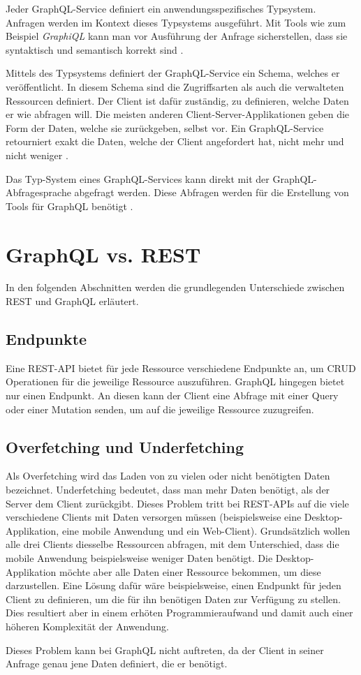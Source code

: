 Jeder GraphQL-Service definiert ein anwendungsspezifisches Typsystem.
Anfragen werden im Kontext dieses Typsystems ausgeführt.
Mit Tools wie zum Beispiel \textit{GraphiQL} kann man vor Ausführung der Anfrage sicherstellen, dass sie syntaktisch und semantisch korrekt sind \parencite[Abs. 1]{graphqlOnline}.

Mittels des Typsystems definiert der GraphQL-Service ein Schema, welches er veröffentlicht.
In diesem Schema sind die Zugriffsarten als auch die verwalteten Ressourcen definiert.
Der Client ist dafür zuständig, zu definieren, welche Daten er wie abfragen will.
Die meisten anderen Client-Server-Applikationen geben die Form der Daten, welche sie zurückgeben, selbst vor.
Ein GraphQL-Service retourniert exakt die Daten, welche der Client angefordert hat, nicht mehr und nicht weniger \parencite[Abs. 1]{graphqlOnline}.

Das Typ-System eines GraphQL-Services kann direkt mit der GraphQL-Abfragesprache abgefragt werden. Diese Abfragen werden für die Erstellung von Tools für GraphQL benötigt \parencite[Abs. 1]{graphqlOnline}.

\section{GraphQL vs. REST}
In den folgenden Abschnitten werden die grundlegenden Unterschiede zwischen REST und GraphQL erläutert.
\subsection{Endpunkte}
Eine REST-API bietet für jede Ressource verschiedene Endpunkte an, um CRUD Operationen für die jeweilige Ressource auszuführen.
GraphQL hingegen bietet nur einen Endpunkt.
An diesen kann der Client eine Abfrage mit einer Query oder einer Mutation senden, um auf die jeweilige Ressource zuzugreifen.

\subsection{Overfetching und Underfetching}
Als Overfetching wird das Laden von zu vielen oder nicht benötigten Daten bezeichnet.
Underfetching bedeutet, dass man mehr Daten benötigt, als der Server dem Client zurückgibt.
Dieses Problem tritt bei REST-APIs auf die viele verschiedene Clients mit Daten versorgen müssen (beispielsweise eine Desktop-Applikation, eine mobile Anwendung und ein Web-Client).
Grundsätzlich wollen alle drei Clients diesselbe Ressourcen abfragen, mit dem Unterschied, dass die mobile Anwendung beispielsweise weniger Daten benötigt.
Die Desktop-Applikation möchte aber alle Daten einer Ressource bekommen, um diese darzustellen.
Eine Lösung dafür wäre beispielsweise, einen Endpunkt für jeden Client zu definieren, um die für ihn benötigen Daten zur Verfügung zu stellen.
Dies resultiert aber in einem erhöten Programmieraufwand und damit auch einer höheren Komplexität der Anwendung.
\newline

Dieses Problem kann bei GraphQL nicht auftreten, da der Client in seiner Anfrage genau jene Daten definiert, die er benötigt.
